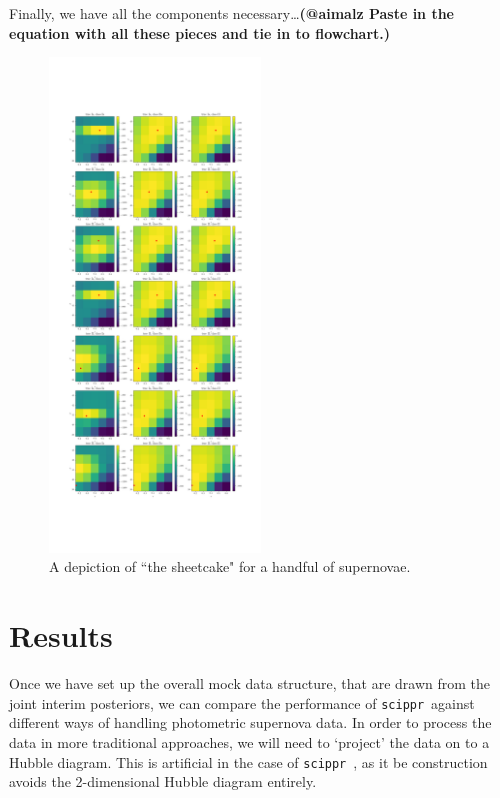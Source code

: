 \documentclass[12pt, twocolumn]{emulateapj}
\newcommand{\scippr}{\texttt{scippr}~}
\begin{document}
Finally, we have all the components necessary\dots  \textbf{(@aimalz Paste in the equation with all these pieces and tie in to flowchart.)}

\begin{figure}
	\begin{center}
		\includegraphics[width=0.5\textwidth]{fig/out_interim_posteriors.png}
		\caption{A depiction of ``the sheetcake" for a handful of supernovae.}
		\label{fig:indieposts}
	\end{center}
\end{figure}


\section{Results}
\label{sec:results}
Once we have set up the overall mock data structure, that are drawn from the joint interim posteriors, we can compare the performance of \scippr against different ways of handling photometric supernova data. 
In order to process the data in more traditional approaches, we will need to `project' the data on to a Hubble diagram. 
This is artificial in the case of \scippr, as it be construction avoids the 2-dimensional Hubble diagram entirely.
\end{document}
